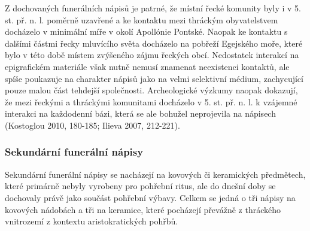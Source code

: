 Z dochovaných funerálních nápisů je patrné, že místní řecké komunity byly i v 5. st. př. n. l. poměrně uzavřené a ke kontaktu mezi thráckým obyvatelstvem docházelo v minimální míře v okolí Apollónie Pontské. Naopak ke kontaktu s dalšími částmi řecky mluvícího světa docházelo na pobřeží Egejského moře, které bylo v této době místem zvýšeného zájmu řeckých obcí. Nedostatek interakcí na epigrafickém materiále však nutně nemusí znamenat neexistenci kontaktů, ale spíše poukazuje na charakter nápisů jako na velmi selektivní médium, zachycující pouze malou část tehdejší společnosti. Archeologické výzkumy naopak dokazují, že mezi řeckými a thráckými komunitami docházelo v 5. st. př. n. l. k vzájemné interakci na každodenní bázi, která se ale bohužel neprojevila na nápisech (Kostoglou 2010, 180-185; Ilieva 2007, 212-221).

\subsubsection[sekundární-funerální-nápisy]{Sekundární funerální nápisy}

Sekundární funerální nápisy se nacházejí na kovových či keramických předmětech, které primárně nebyly vyrobeny pro pohřební ritus, ale do dnešní doby se dochovaly právě jako součást pohřební výbavy. Celkem se jedná o tři nápisy na kovových nádobách a tři na keramice, které pocházejí převážně z thráckého vnitrozemí z kontextu aristokratických pohřbů.

